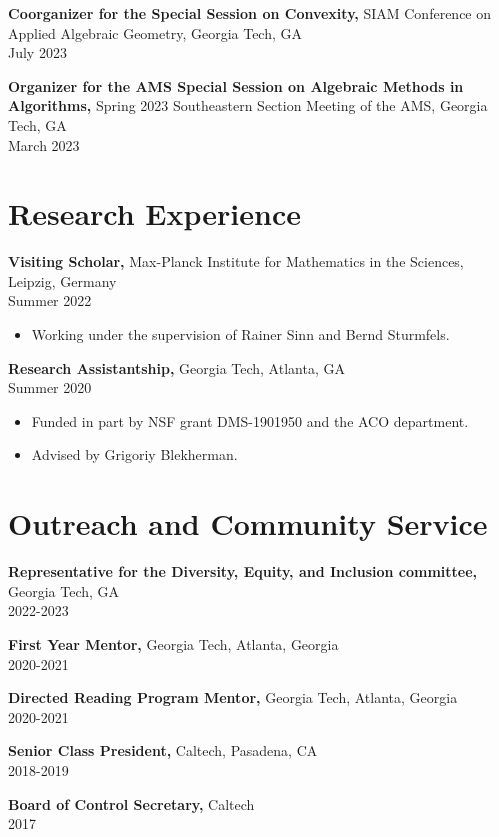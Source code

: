 \documentclass[10pt, letterpaper]{article}
\begin{document}
{\bf Coorganizer for the Special Session on Convexity,} SIAM Conference on Applied Algebraic Geometry, Georgia Tech, GA    \\       July 2023

{\bf Organizer for the AMS Special Session on Algebraic Methods in Algorithms,} Spring 2023 Southeastern Section Meeting of the AMS, Georgia Tech, GA    \\       March 2023

\section{Research Experience}
{\bf Visiting Scholar,} Max-Planck Institute for Mathematics in the Sciences, Leipzig, Germany \\ Summer 2022
\begin{itemize} \itemsep -2pt %
\item Working under the supervision of Rainer Sinn and Bernd Sturmfels.
\end{itemize}
{\bf Research Assistantship,} Georgia Tech, Atlanta, GA \\ Summer 2020
\begin{itemize} \itemsep -2pt %
\item Funded in part by NSF grant DMS-1901950 and the ACO department.
\item Advised by Grigoriy Blekherman.
\end{itemize}

\section{Outreach and Community Service} 
       {\bf Representative for the Diversity, Equity, and Inclusion committee,} Georgia Tech, GA    \\         2022-2023

       {\bf First Year Mentor,} Georgia Tech, Atlanta, Georgia     \\         2020-2021 

       {\bf Directed Reading Program Mentor,} Georgia Tech, Atlanta, Georgia     \\         2020-2021 

       {\bf Senior Class President,} Caltech, Pasadena, CA    \\         2018-2019 

		{\bf Board of Control Secretary,} Caltech \\   2017
\end{document}
